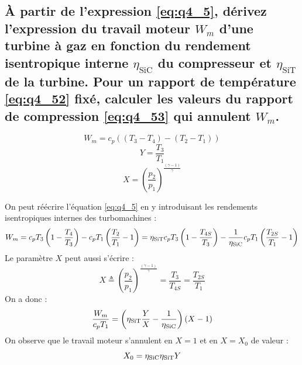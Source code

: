 \subsection{À partir de l'expression \ref{eq:q4_5}, dérivez l'expression du travail moteur $W_m$ d'une turbine à gaz en fonction du rendement isentropique interne $\eta_\text{SiC}$ du compresseur et $\eta_\text{SiT}$ de la turbine. Pour un rapport de température \ref{eq:q4_52} fixé, calculer les valeurs du rapport de compression \ref{eq:q4_53} qui annulent $W_m$.}
\begin{equation} \label{eq:q4_5} W_m = c_p\left(\left(T_3-T_4\right) - \left(T_2-T_1\right)\right) \end{equation}
\begin{equation} \label{eq:q4_52} Y = \frac{T_3}{T_1} \end{equation}
\begin{equation} \label{eq:q4_53} X = \left(\frac{p_2}{p_1}\right)^\frac{(\gamma-1)}{\gamma} \end{equation}

On peut réécrire l'équation \ref{eq:q4_5} en y introduisant les rendements isentropiques internes des turbomachines :
\begin{equation} W_m = c_pT_3\left(1-\frac{T_4}{T_3}\right) - c_pT_1\left(\frac{T_2}{T_1} - 1\right) = \eta_\text{SiT} c_pT_3\left(1-\frac{T_{4S}}{T_3}\right) - \frac{1}{\eta_\text{SiC}}c_pT_1\left(\frac{T_{2S}}{T_1} - 1\right) \end{equation}
Le paramètre $X$ peut aussi s'écrire :
\begin{equation} X \triangleq \left(\frac{p_2}{p_1}\right)^\frac{(\gamma-1)}{\gamma} = \frac{T_3}{T_{4S}} = \frac{T_{2S}}{T_{1}} \end{equation}
On a donc :
\begin{equation} \frac{W_m}{c_pT_1} = \left(\eta_\text{SiT}\frac{Y}{X}-\frac{1}{\eta_\text{SiC}}\right)(X-1) \end{equation}
On observe que le travail moteur s'annulent en $X=1$ et en $X = X_0$ de valeur :
\begin{equation} X_0 = \eta_\text{SiC}\eta_\text{SiT} Y \end{equation}

